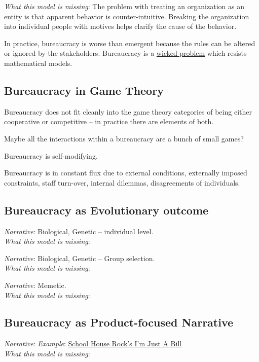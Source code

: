 \textit{What this model is missing}: The problem with treating an organization as an entity is that apparent behavior is counter-intuitive. Breaking the organization into individual people with motives helps clarify the cause of the behavior. 

In practice, bureaucracy is worse than emergent because the rules can be altered or ignored by the stakeholders. Bureaucracy is a \href{https://en.wikipedia.org/wiki/Wicked_problem}{wicked problem} which resists mathematical models. 

\subsection{Bureaucracy in Game Theory}
Bureaucracy does not fit cleanly into the game theory categories of being either cooperative or competitive -- in practice there are elements of both. 


Maybe all the interactions within a bureaucracy are a bunch of small games?

Bureaucracy is self-modifying. 

Bureaucracy is in constant flux due to external conditions, externally imposed constraints, staff turn-over, internal dilemmas, disagreements of individuals. 




\subsection{Bureaucracy as Evolutionary outcome}


\textit{Narrative}: Biological, Genetic -- individual level. \\
\textit{What this model is missing}: 

\textit{Narrative}: Biological, Genetic -- Group selection. \\
\textit{What this model is missing}: 

\textit{Narrative}: Memetic. \\
\textit{What this model is missing}: 

\subsection{Bureaucracy as Product-focused Narrative}
\textit{Narrative}: 
\textit{Example}: \href{https://www.youtube.com/watch?v=OgVKvqTItto}{School House Rock's I'm Just A Bill}\\
\textit{What this model is missing}: 

